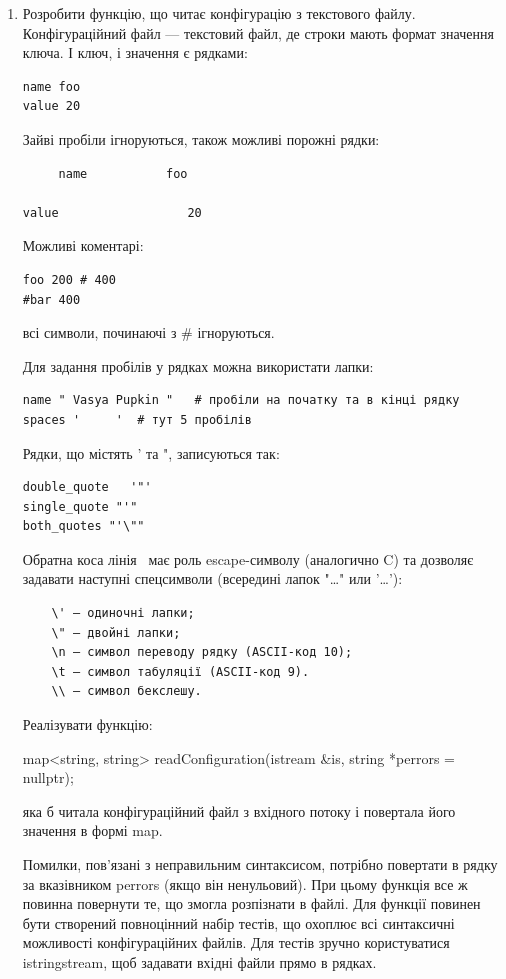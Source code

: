 \documentclass[a5paper,titlepage,openany,twoside,draft]{book_unv}%
\begin{document}
\begin{enumerate}
\def\labelenumi{\arabic{enumi})}
\setcounter{enumi}{20}
\item
Розробити функцію, що читає конфігурацію з текстового файлу.
Конфігураційний файл --- текстовий файл, де строки мають формат значення ключа.
І ключ, і значення є рядками:
\begin{verbatim} 
name foo
value 20
\end{verbatim}
Зайві пробіли ігноруються, також можливі порожні рядки:
\begin{verbatim}
     name           foo

value                  20
\end{verbatim}
Можливі коментарі:
\begin{verbatim}
foo 200 # 400
#bar 400
\end{verbatim}
всі символи, починаючі з \# ігноруються.

Для задання пробілів у рядках можна використати лапки:
\begin{verbatim}
name " Vasya Pupkin "   # пробіли на початку та в кінці рядку
spaces '     '  # тут 5 пробілів
\end{verbatim}
Рядки, що містять ' та ", записуються так:
\begin{verbatim}
double_quote   '"'
single_quote "'"
both_quotes "'\""
\end{verbatim}
Обратна коса лінія \ має роль escape-символу (аналогично C) та дозволяє задавати наступні спецсимволи
 (всередині лапок "…" или '…'):
\begin{verbatim}
    \' – одиночні лапки;
    \" – двойні лапки;
    \n – символ переводу рядку (ASCII-код 10);
    \t – символ табуляції (ASCII-код 9).
    \\ — символ бекслешу.
\end{verbatim}
Реалізувати функцію:

map<string, string> readConfiguration(istream \&is,
                                      string *perrors = nullptr);

яка б читала конфігураційний файл з вхідного потоку і повертала його значення в формі map.

Помилки, пов'язані з неправильним синтаксисом, потрібно повертати в рядку за вказівником perrors (якщо він ненульовий). 
При цьому функція все ж повинна повернути те, що змогла розпізнати в файлі.
Для функції повинен бути створений повноцінний набір тестів, що охоплює всі синтаксичні можливості конфігураційних файлів. Для тестів зручно користуватися istringstream, щоб задавати вхідні файли прямо в рядках. 



\end{enumerate}
\end{document}
